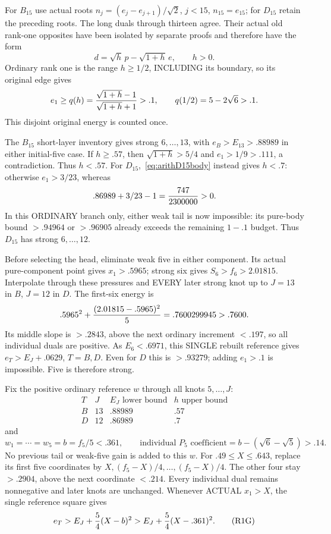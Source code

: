 \documentclass[11pt]{article}
\begin{document}
For \(B_{15}\) use actual roots
\(n_j=(e_j-e_{j+1})/\sqrt2\), \(j<15\), \(n_{15}=e_{15}\);
for \(D_{15}\) retain the preceding roots.
The long duals through thirteen agree.
Their actual old rank-one opposites have been isolated
by separate proofs and therefore have the form
\[
                d=\sqrt h\,p-\sqrt{1+h}\,e,\qquad h>0.
\]
Ordinary rank one is the range \(h\ge1/2\), INCLUDING
its boundary, so its original edge gives
\[
 e_1\ge q(h)={\sqrt{1+h}-1\over\sqrt{1+h}+1}>.1,
 \qquad q(1/2)=5-2\sqrt6>.1 .
\]
This disjoint original energy is counted once.

The \(B_{15}\) short-layer inventory gives strong
\(6,\ldots,13\), with \(e_B>E_{13}>.88989\)
in either initial-five case.
If \(h\ge.57\), then \(\sqrt{1+h}>5/4\)
and \(e_1>1/9>.111\), a contradiction.
Thus \(h<.57\).
For \(D_{15}\),~\eqref{eq:arithD15body} instead gives
\(h<.7\): otherwise \(e_1>3/23\), whereas
\[
                         .86989+3/23-1={747\over2300000}>0 .
\]
In this ORDINARY branch only, either weak tail is now
impossible: its pure-body bound \(>.94964\) or \(>.96905\)
already exceeds the remaining \(1-.1\) budget.
Thus \(D_{15}\) has strong \(6,\ldots,12\).

Before selecting the head, eliminate weak five in either
component.
Its actual pure-component point gives \(x_1>.5965\);
strong six gives \(S_6>f_6>2.01815\).
Interpolate through these pressures and EVERY later
strong knot up to \(J=13\) in \(B\), \(J=12\) in \(D\).
The first-six energy is
\[
 .5965^2+{(2.01815-.5965)^2\over5}
        =.7600299945>.7600 .
\]
Its middle slope is \(>.2843\), above the next ordinary
increment \(<.197\), so all individual duals are positive.
As \(E_6<.6971\), this SINGLE rebuilt reference gives
\(e_T>E_J+.0629\), \(T=B,D\).
Even for \(D\) this is \(>.93279\); adding \(e_1>.1\)
is impossible.
Five is therefore strong.

Fix the positive ordinary reference \(w\) through all
knots \(5,\ldots,J\):
\[
 \begin{array}{c|c|c|c}
 T&J&E_J\text{ lower bound}&h\text{ upper bound}\\ \hline
 B&13&.88989&.57\\
 D&12&.86989&.7
 \end{array}
\]
and
\[
 w_1=\cdots=w_5=b=f_5/5<.361,\qquad
 \text{individual }P_5\text{ coefficient}=
 b-(\sqrt6-\sqrt5)>.14 .
\]
No previous tail or weak-five gain is added to this \(w\).
For \(.49\le X\le.643\), replace its first five
coordinates by \(X,(f_5-X)/4,\ldots,(f_5-X)/4\).
The other four stay \(>.2904\), above the next
coordinate \(<.214\).
Every individual dual remains nonnegative and later
knots are unchanged.
Whenever ACTUAL \(x_1>X\), the single reference square gives
\[
                   e_T>E_J+{5\over4}(X-b)^2
                       >E_J+{5\over4}(X-.361)^2 .
\tag{R1G}\label{eq:arithBD15graft}
\]
\end{document}
